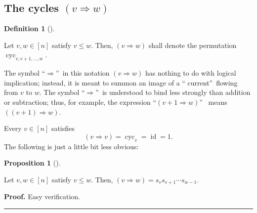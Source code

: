 \documentclass[numbers=enddot,12pt,final,onecolumn,notitlepage]{scrartcl}%
\theoremstyle{definition}
\newtheorem{prop}[theo]{Proposition}
\newenvironment{proposition}[1][]
{\begin{prop}[#1]\begin{leftbar}}
{\end{leftbar}\end{prop}}
\newtheorem{defi}[theo]{Definition}
\newenvironment{definition}[1][]
{\begin{defi}[#1]\begin{leftbar}}
{\end{leftbar}\end{defi}}
\newenvironment{vershort}{}{}
\newenvironment{proof}[1][Proof]{\noindent\textbf{#1.} }{\ \rule{0.5em}{0.5em}}
\begin{document}
\subsection{The cycles $\left(  v\Longrightarrow w\right)  $}

\begin{definition}
Let $v,w\in\left[  n\right]  $ satisfy $v\leq w$. Then, $\left(
v\Longrightarrow w\right)  $ shall denote the permutation $\operatorname*{cyc}%
\nolimits_{v,v+1,\ldots,w}$.
\end{definition}

The symbol \textquotedblleft$\Longrightarrow$\textquotedblright\ in this
notation $\left(  v\Longrightarrow w\right)  $ has nothing to do with logical
implication; instead, it is meant to summon an image of a \textquotedblleft
current\textquotedblright\ flowing from $v$ to $w$. The symbol
\textquotedblleft$\Longrightarrow$\textquotedblright\ is understood to bind
less strongly than addition or subtraction; thus, for example, the expression
\textquotedblleft$\left(  v+1\Longrightarrow w\right)  $\textquotedblright%
\ means $\left(  \left(  v+1\right)  \Longrightarrow w\right)  $.

Every $v\in\left[  n\right]  $ satisfies
\begin{equation}
\left(  v\Longrightarrow v\right)  =\operatorname*{cyc}\nolimits_{v}%
=\operatorname*{id}=1. \label{eq.p-cyc-p=1}%
\end{equation}
The following is just a little bit less obvious:

\begin{proposition}
\label{prop.cycpq.sss}Let $v,w\in\left[  n\right]  $ satisfy $v\leq w$. Then,
$\left(  v\Longrightarrow w\right)  =s_{v}s_{v+1}\cdots s_{w-1}$.
\end{proposition}

\begin{vershort}
\begin{proof}
Easy verification.
\end{proof}
\end{vershort}
\end{document}
